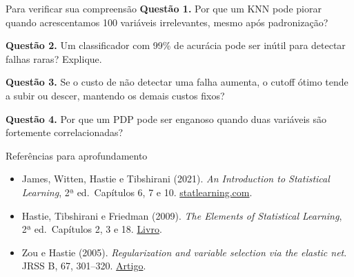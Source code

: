 \documentclass[
  10pt,
  ignorenonframetext,
  aspectratio=169,
  brazilian,
]{beamer}
\providecommand{\tightlist}{%
  \setlength{\itemsep}{0pt}\setlength{\parskip}{0pt}}
\begin{document}
\begin{frame}{Para verificar sua compreensão}
\protect{}\label{para-verificar-sua-compreensuxe3o}
\textbf{Questão 1.} Por que um KNN pode piorar quando acrescentamos 100
variáveis irrelevantes, mesmo após padronização?

\textbf{Questão 2.} Um classificador com 99\% de acurácia pode ser
inútil para detectar falhas raras? Explique.

\textbf{Questão 3.} Se o custo de não detectar uma falha aumenta, o
cutoff ótimo tende a subir ou descer, mantendo os demais custos fixos?

\textbf{Questão 4.} Por que um PDP pode ser enganoso quando duas
variáveis são fortemente correlacionadas?

\end{frame}

\begin{frame}{Referências para aprofundamento}
\protect{}\label{referuxeancias-para-aprofundamento}
\begin{itemize}
\tightlist
\item
  James, Witten, Hastie e Tibshirani (2021). \emph{An Introduction to
  Statistical Learning}, 2ª ed.~Capítulos 6, 7 e 10.
  \href{https://www.statlearning.com/}{statlearning.com}.
\item
  Hastie, Tibshirani e Friedman (2009). \emph{The Elements of
  Statistical Learning}, 2ª ed.~Capítulos 2, 3 e 18.
  \href{https://hastie.su.domains/ElemStatLearn/}{Livro}.
\item
  Zou e Hastie (2005). \emph{Regularization and variable selection via
  the elastic net}. JRSS B, 67, 301--320.
  \href{https://web.stanford.edu/~hastie/Papers/elasticnet.pdf}{Artigo}.
\end{itemize}
\end{frame}
\end{document}
